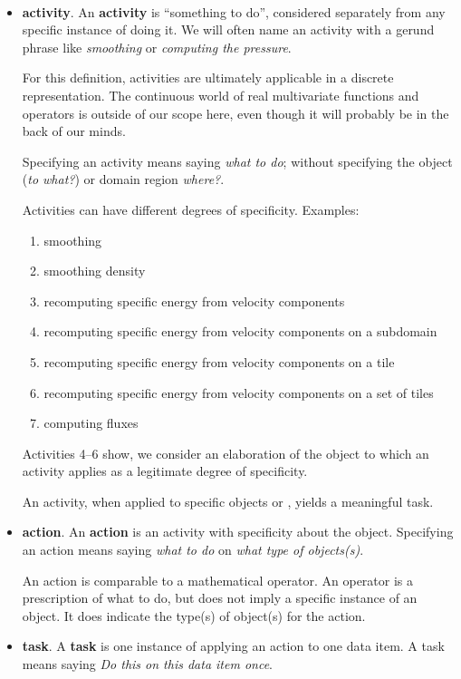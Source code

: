 \documentclass{article}
\begin{document}
\\

\begin{itemize}
\item \textbf{activity}.
An \textbf{activity} is ``something to do'', considered separately from any
specific instance of doing it.
We will often name an activity with a
gerund phrase like \emph{smoothing} or \emph{computing the pressure}.

For this definition, activities
are ultimately applicable in a discrete representation.
The continuous
world of real multivariate functions and operators is outside
of our scope here, even though it will probably be in the back of our minds.

Specifying an activity
means saying \textit{what to do}; without specifying the object (\textit{to what?}) or domain region \textit{where?}.

Activities can have different degrees of specificity.
Examples:
\begin{enumerate}
\item smoothing
\item smoothing density
\item recomputing specific energy from velocity components
\item recomputing specific energy from velocity components on a subdomain
\item recomputing specific energy from velocity components on a tile
\item recomputing specific energy from velocity components on a set of tiles
\item computing fluxes
\end{enumerate}
Activities 4--6 show, we consider an elaboration of the object to which
an activity applies as a legitimate degree of specificity.

An activity, when applied to specific
objects or \domregions, yields a meaningful task.


\item \textbf{action}.
An \textbf{action} is an activity with specificity about the object.
Specifying an action
means saying \textit{what to do} on \textit{what type of objects(s)}.

An action is comparable to a mathematical operator. An operator
is a prescription of what to do, but does not imply a
specific instance of an object. It does
indicate the type(s) of object(s) for the action.

\item \textbf{task}.
A \textbf{task} is one instance of applying an action to one data item.
A task
means saying \textit{Do this on this data item once}.


\end{itemize}
\end{document}
